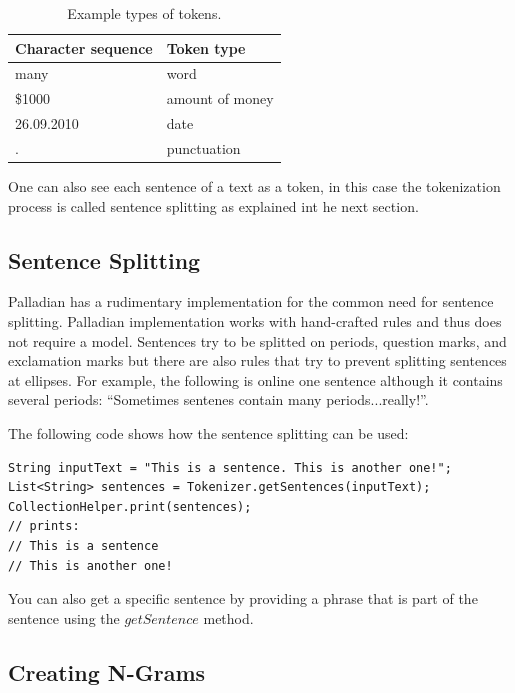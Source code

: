 \documentclass[a4paper,twoside]{book}      %
\begin{document}
\begin{table}[ht!]
\centering
\begin{tabular}{|l|l|}
\hline
Character sequence		& Token type \\
\hline
many			& word \\
\hline
\$1000		& amount of money  \\
\hline
26.09.2010	& date \\
\hline
.				& punctuation \\
\hline
\end{tabular} 
\caption{Example types of tokens.}
\label{tab:tokenTypes}
\end{table}

One can also see each sentence of a text as a token, in this case the tokenization process is called sentence splitting as explained int he next section.

\subsection{Sentence Splitting}
Palladian has a rudimentary implementation for the common need for sentence splitting. Palladian implementation works with hand-crafted rules and thus does not require a model. Sentences try to be splitted on periods, question marks, and exclamation marks but there are also rules that try to prevent splitting sentences at ellipses. For example, the following is online one sentence although it contains several periods: ``Sometimes sentenes contain many periods...really!''.

The following code shows how the sentence splitting can be used:
\begin{codelisting}
\begin{lstlisting}[caption=Using the sentence splitter.,frame=tb]
String inputText = "This is a sentence. This is another one!";
List<String> sentences = Tokenizer.getSentences(inputText);
CollectionHelper.print(sentences);
// prints:
// This is a sentence
// This is another one!
\end{lstlisting}
\end{codelisting}

You can also get a specific sentence by providing a phrase that is part of the sentence using the $getSentence$ method.

\subsection{Creating N-Grams}
\label{sec:ngrams}
\end{document}
